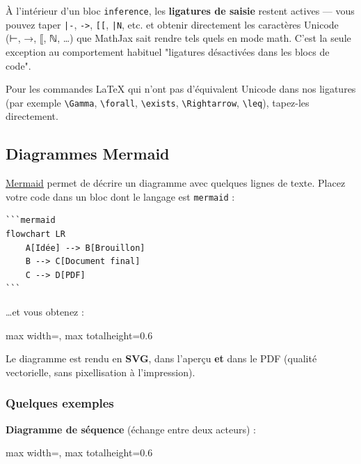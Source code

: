 \documentclass[11pt,a4paper]{article}
\theoremstyle{definition}
\begin{document}
À l'intérieur d'un bloc \texttt{inference}, les \textbf{ligatures de saisie}
restent actives — vous pouvez taper \texttt{|-}, \texttt{->}, \texttt{[[}, \texttt{|N}, etc. et
obtenir directement les caractères Unicode (⊢, →, ⟦, ℕ, …) que
MathJax sait rendre tels quels en mode math. C'est la seule
exception au comportement habituel "ligatures désactivées dans les
blocs de code".


Pour les commandes LaTeX qui n'ont pas d'équivalent Unicode dans nos
ligatures (par exemple \texttt{\textbackslash{}Gamma}, \texttt{\textbackslash{}forall}, \texttt{\textbackslash{}exists}, \texttt{\textbackslash{}Rightarrow},
\texttt{\textbackslash{}leq}), tapez-les directement.


\subsection{Diagrammes Mermaid}

\href{https://mermaid.js.org/}{Mermaid} permet de décrire un diagramme avec
quelques lignes de texte. Placez votre code dans un bloc dont le
langage est \texttt{mermaid} :


\begin{lstlisting}
```mermaid
flowchart LR
    A[Idée] --> B[Brouillon]
    B --> C[Document final]
    C --> D[PDF]
```
\end{lstlisting}


…et vous obtenez :


\begin{center}
\begin{adjustbox}{max width=\textwidth, max totalheight=0.6\textheight}

\end{adjustbox}
\end{center}


Le diagramme est rendu en \textbf{SVG}, dans l'aperçu \textbf{et} dans le PDF
(qualité vectorielle, sans pixellisation à l'impression).


\subsubsection{Quelques exemples}

\textbf{Diagramme de séquence} (échange entre deux acteurs) :


\begin{center}
\begin{adjustbox}{max width=\textwidth, max totalheight=0.6\textheight}

\end{adjustbox}
\end{center}
\end{document}
